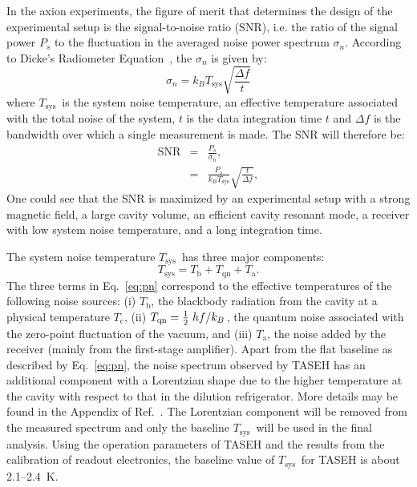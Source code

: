 \documentclass[%
 reprint,prl, %
 amsmath,amssymb,
 aps,
]{revtex4-2}
\newcommand{\tsys}{\ensuremath{T_\text{sys}}}
\newcommand{\ta}{\ensuremath{T_\text{a}}}
\newcommand{\noise}{\ensuremath{1.9 - 2.2}}
\begin{document}
In the axion experiments, the figure of merit that determines the design of 
the experimental setup is the signal-to-noise ratio
(SNR), i.e. the ratio of the signal power $P_s$ to the fluctuation in 
the averaged noise power spectrum $\sigma_n$. 
According to Dicke's Radiometer Equation~\cite{Dicke}, the $\sigma_n$ 
is given by: 
\begin{equation}
 \sigma_n  =  k_B\tsys\sqrt{\frac{\Delta f}{t}} 
 \label{eq:sigman}
\end{equation}
where \tsys\ is the system noise temperature, an effective 
temperature associated with the total noise of the system, 
$t$ is the data integration time $t$ 
and $\Delta f$ is the bandwidth over which a single measurement is made. 
The SNR will therefore be: 
\begin{eqnarray}
   \text{SNR} & = & \frac{P_s}{\sigma_n}, \nonumber \\
              & = & \frac{P_s}{k_B\tsys}\sqrt{\frac{t}{\Delta f}},
 \label{eq:SNR}
\end{eqnarray}  
One could see that the SNR is maximized by an experimental setup with 
a strong magnetic field, a large cavity volume, an efficient cavity 
resonant mode, a receiver with low system noise temperature, and a 
long integration time. 

The system noise temperature \tsys\ has three major components: 
\begin{equation}
  \tsys = T_\text{b} + T_\text{qn}  + \ta.
\label{eq:pn}
\end{equation}
%   
 The three terms in Eq.~\eqref{eq:pn} correspond to the effective 
temperatures of the following noise sources: (i) $T_\text{b}$, the blackbody 
radiation from the cavity at a physical temperature $T_\mathrm{c}$, (ii) 
$T_\text{qn} = \frac{1}{2}\left. hf\middle/k_B\right.$, the quantum noise 
associated with the zero-point fluctuation of the vacuum, and (iii) \ta, the 
noise added by the receiver (mainly from the first-stage amplifier). 
Apart from the flat baseline as described by 
Eq.~\eqref{eq:pn}, the noise spectrum observed by TASEH has an additional 
component with a Lorentzian shape due to the higher temperature at the 
cavity with respect to that in the dilution refrigerator. 
More details may be found in the Appendix of Ref.~\cite{TASEHAnalysis}.  
The Lorentzian component will be removed from the measured spectrum and only 
the baseline \tsys\ will be used in the final analysis. 
%
Using the operation parameters of TASEH and 
the results from the calibration of readout electronics, 
the baseline value of \tsys\ for TASEH is about 2.1--2.4~K. 
\end{document}
